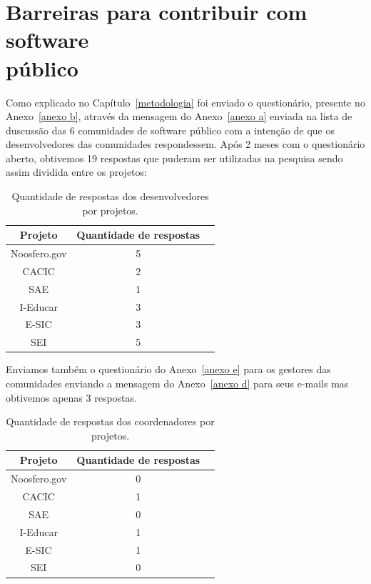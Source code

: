 \chapter{Barreiras para contribuir com software \\público}
\label{barreiras_publico}

Como explicado no Capítulo~\ref{metodologia} foi enviado o questionário, 
presente no Anexo~\ref{anexo b}, através da mensagem do Anexo~\ref{anexo a} 
enviada na lista de duscussão das 6 comunidades de software público com 
a intenção de que os desenvolvedores das comunidades respondessem. Após 2 
meses com o questionário aberto, obtivemos 19 respostas que puderam ser 
utilizadas na pesquisa sendo assim dividida entre os projetos:

\begin{table}[h]
	\centering
	\begin{tabular}{ccc}
		\toprule
		\textbf{Projeto} & \textbf{Quantidade de respostas} \\
		\midrule
		Noosfero.gov & 5 \\
		CACIC & 2 \\
		SAE & 1 \\
		I-Educar & 3 \\
		E-SIC & 3 \\
		SEI & 5 \\
		\bottomrule
	\end{tabular}

	\caption{Quantidade de respostas dos desenvolvedores por projetos.}
	\label{tab01}
\end{table}
  

Enviamos também o questionário do Anexo~\ref{anexo e} para os gestores das 
comunidades enviando a mensagem do Anexo~\ref{anexo d} para seus e-mails mas 
obtivemos apenas 3 respostas.

\begin{table}[h]
	\centering
	\begin{tabular}{ccc}
		\toprule
		\textbf{Projeto} & \textbf{Quantidade de respostas} \\
		\midrule
		Noosfero.gov & 0 \\
		CACIC & 1 \\
		SAE & 0 \\
		I-Educar & 1 \\
		E-SIC & 1 \\
		SEI & 0 \\
		\bottomrule
	\end{tabular}

	\caption{Quantidade de respostas dos coordenadores por projetos.}
	\label{tab02}
\end{table}



